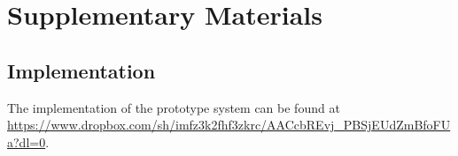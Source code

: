 \newpage
\section{Supplementary Materials}


\subsection{Implementation}
The implementation of the prototype system can be found at \url{https://www.dropbox.com/sh/imfz3k2fhf3zkrc/AACcbREvj_PBSjEUdZmBfoFUa?dl=0}.
